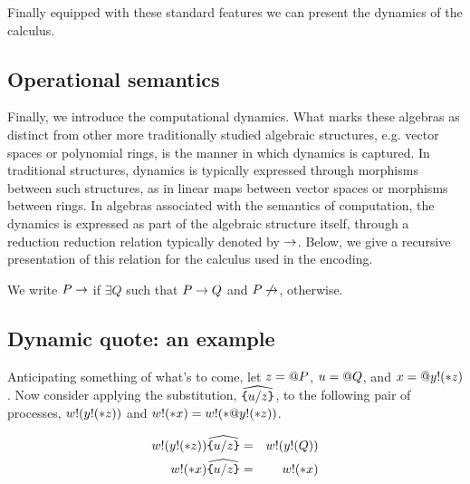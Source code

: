 Finally equipped with these standard features we can present the
dynamics of the calculus.

\subsection{Operational semantics}

Finally, we introduce the computational dynamics. What marks these
algebras as distinct from other more traditionally studied algebraic
structures, e.g. vector spaces or polynomial rings, is the manner in
which dynamics is captured. In traditional structures, dynamics is typically
expressed through morphisms between such structures, as in linear maps
between vector spaces or morphisms between rings. In algebras
associated with the semantics of computation, the dynamics is
expressed as part of the algebraic structure itself, through a
reduction reduction relation typically denoted by $\rightarrow$. Below, we
give a recursive presentation of this relation for the calculus used
in the encoding.


We write $P\rightarrow$ if $\exists Q $ such that $ P \rightarrow Q$ and $P\not\rightarrow$, otherwise.

\subsection{ Dynamic quote: an example }

Anticipating something of what's to come, let $z = \mathsf{@} P$, $u = \mathsf{@} Q$, and $x = \mathsf{@} y \mathsf{!}(\mathsf{*} z)$. Now consider applying the substitution,
$\widehat{\texttt{\{}u / z \texttt{\}}}$, to the following pair of processes,
$w \mathsf{!}(y!(\mathsf{*} z))$ and $w \mathsf{!}(\mathsf{*} x) = w \mathsf{!}(\mathsf{*} \mathsf{@} y \mathsf{!}(\mathsf{*} z))$.

\begin{eqnarray}
	w \mathsf{!}(y \mathsf{!}(\mathsf{*} z))\widehat{\texttt{\{}u / z \texttt{\}}}
		& = &
		w \mathsf{!}(y \mathsf{!}(Q)) \nonumber\\
	w \mathsf{!}(\mathsf{*} x) \widehat{ \texttt{\{}u / z \texttt{\}} }
		& = &
		w \mathsf{!}(\mathsf{*} x) \nonumber
\end{eqnarray}

